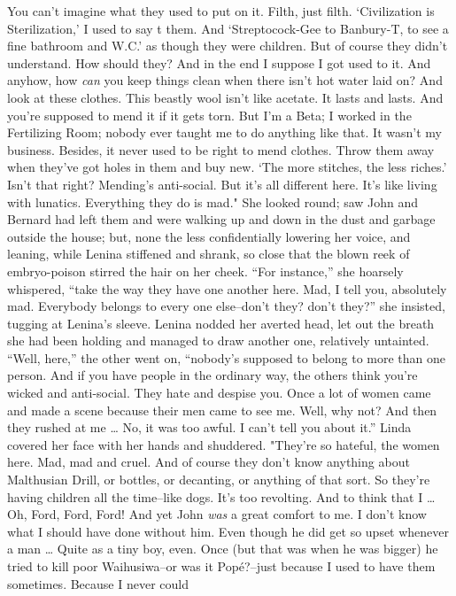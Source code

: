 \documentclass[12pt]{report}
\begin{document}
You can't imagine what they used to put on it. Filth, just filth.
`Civilization is Sterilization,' I used to say t them. And
`Streptocock-Gee to Banbury-T, to see a fine bathroom and W.C.' as
though they were children. But of course they didn't understand. How
should they? And in the end I suppose I got used to it. And anyhow, how
\emph{can} you keep things clean when there isn't hot water laid on? And
look at these clothes. This beastly wool isn't like acetate. It lasts
and lasts. And you're supposed to mend it if it gets torn. But I'm a
Beta; I worked in the Fertilizing Room; nobody ever taught me to do
anything like that. It wasn't my business. Besides, it never used to be
right to mend clothes. Throw them away when they've got holes in them
and buy new. `The more stitches, the less riches.' Isn't that right?
Mending's anti-social. But it's all different here. It's like living
with lunatics. Everything they do is mad." She looked round; saw John
and Bernard had left them and were walking up and down in the dust and
garbage outside the house; but, none the less confidentially lowering
her voice, and leaning, while Lenina stiffened and shrank, so close that
the blown reek of embryo-poison stirred the hair on her cheek. ``For
instance,'' she hoarsely whispered, ``take the way they have one another
here. Mad, I tell you, absolutely mad. Everybody belongs to every one
else--don't they? don't they?'' she insisted, tugging at Lenina's
sleeve. Lenina nodded her averted head, let out the breath she had been
holding and managed to draw another one, relatively untainted. ``Well,
here,'' the other went on, ``nobody's supposed to belong to more than
one person. And if you have people in the ordinary way, the others think
you're wicked and anti-social. They hate and despise you. Once a lot of
women came and made a scene because their men came to see me. Well, why
not? And then they rushed at me \ldots{} No, it was too awful. I can't
tell you about it.'' Linda covered her face with her hands and
shuddered. "They're so hateful, the women here. Mad, mad and cruel. And
of course they don't know anything about Malthusian Drill, or bottles,
or decanting, or anything of that sort. So they're having children all
the time--like dogs. It's too revolting. And to think that I \ldots{}
Oh, Ford, Ford, Ford! And yet John \emph{was} a great comfort to me. I
don't know what I should have done without him. Even though he did get
so upset whenever a man \ldots{} Quite as a tiny boy, even. Once (but
that was when he was bigger) he tried to kill poor Waihusiwa--or was it
Popé?--just because I used to have them sometimes. Because I never could
\end{document}
